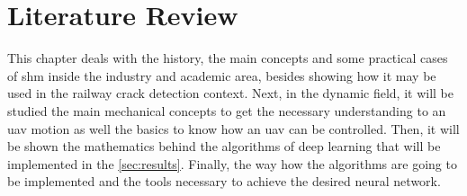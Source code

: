 \chapter{Literature Review}\label{sec:literature_review}

This chapter deals with the history, the main concepts and some practical cases of \gls*{shm} inside the industry and academic area, besides showing how it may be used in the railway crack detection context.
Next, in the dynamic field, it will be studied the main mechanical concepts to get the necessary understanding to an \gls*{uav} motion as well the basics to know how an \gls*{uav} can be controlled.
Then, it will be shown the mathematics behind the algorithms of deep learning that will be implemented in the \cref{sec:results}. 
Finally, the way how the algorithms are going to be implemented and the tools necessary to achieve the desired neural network.